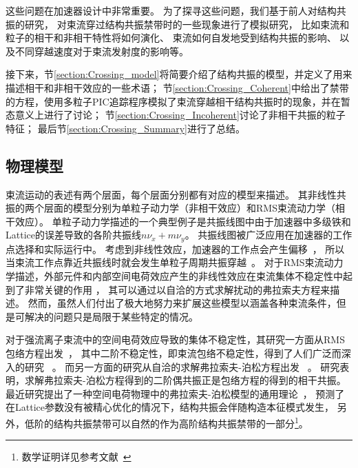 这些问题在加速器设计中非常重要。
为了探寻这些问题，我们基于前人对结构共振的研究，
对束流穿过结构共振禁带时的一些现象进行了模拟研究，
比如束流和粒子的相干和非相干特性将如何演化、
束流如何自发地受到结构共振的影响、
以及不同穿越速度对于束流发射度的影响等。

接下来，节\eqref{section:Crossing_model}将简要介绍了结构共振的模型，并定义了用来描述相干和非相干效应的一些术语；
节\eqref{section:Crossing_Coherent}中给出了禁带的方程，使用多粒子PIC追踪程序模拟了束流穿越相干结构共振时的现象，并在暂态意义上进行了讨论；
节\eqref{section:Crossing_Incoherent}讨论了非相干共振的粒子特征；
最后节\eqref{section:Crossing_Summary}进行了总结。



\subsection{物理模型}
\label{section:Crossing_model}
束流运动的表述有两个层面，每个层面分别都有对应的模型来描述。
其非线性共振的两个层面的模型分别为单粒子动力学（非相干效应）和RMS束流动力学（相干效应）。
单粒子动力学描述的一个典型例子是共振线图中由于加速器中多级铁和Lattice的误差导致的各阶共振线$n\nu_x+m\nu_y$。
共振线图被广泛应用在加速器的工作点选择和实际运行中。
考虑到非线性效应，加速器的工作点会产生偏移~\cite{fedotov2001space}，
所以当束流工作点靠近共振线时就会发生单粒子周期共振穿越~\cite{franchetti2006particle}。
对于RMS束流动力学描述，外部元件和内部空间电荷效应产生的非线性效应在束流集体不稳定性中起到了非常关键的作用
\cite{sacherer1968transverse, sacherer1973longitudinal}，
其可以通过以自洽的方式求解扰动的弗拉索夫方程来描述\cite{chao1993physics,gluckstern1970oscillation,gluckstern1970stability}。
然而，虽然人们付出了极大地努力来扩展这些模型以涵盖各种束流条件，但是可解决的问题只是局限于某些特定的情况。

对于强流离子束流中的空间电荷效应导致的集体不稳定性，其研究一方面从RMS包络方程出发~\cite{sacherer1971rms}，
其中二阶不稳定性，即束流包络不稳定性，得到了人们广泛而深入的研究 ~\cite{14,15,li2014envelope,li2015space,21,22}。
而另一方面的研究从自洽的求解弗拉索夫-泊松方程出发 ~\cite{11,li2018structure,18,19}。
研究表明，求解弗拉索夫-泊松方程得到的二阶偶共振正是包络方程的得到的相干共振。
最近研究提出了一种空间电荷物理中的弗拉索夫-泊松模型的通用理论~\cite{11,li2018structure}，
预测了在Lattice参数没有被精心优化的情况下，结构共振会伴随构造本征模式发生，
另外，低阶的结构共振禁带可以自然的作为高阶结构共振禁带的一部分\footnote{数学证明详见参考文献~\cite{li2018structure}}。

